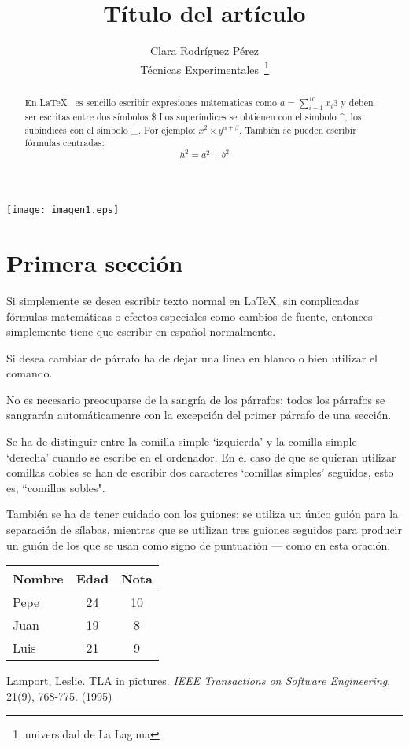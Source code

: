 \documentclass[a4paper,12pt]{article}
\begin{document}
\texttt{[image: imagen1.eps]}

\title{Título del artículo}
\author{Clara Rodr\'iguez P\'erez \\
          Técnicas Experimentales~\footnote{universidad de La Laguna}
          }
\date{\Today}
\maketitle
\begin{abstract}
  En \LaTeX{}~\cite{Lam:86} es sencillo escribir expresiones
  mátematicas como $a=\sum_{i=1}^{10} {x_i}{3}$
  y deben ser escritas entre dos símbolos \$
  Los superíndices se obtienen con el símbolo \^{},
  los subíndices con el símbolo \_.
  Por ejemplo: $x^2\times y ^{\alpha + \beta}$.
  También se pueden escribir f\'ormulas centradas:
  \[h^2=a^2  + b^2\]
\end{abstract}

\section{Primera sección}

Si simplemente se desea escribir texto normal en LaTeX, 
sin complicadas f\'ormulas matem\'aticas o efectos especiales
como cambios de fuente, entonces simplemente tiene que escribir
en espa\~nol normalmente.\par
Si desea cambiar de párrafo ha de dejar una línea en blanco o bien
utilizar el comando. \par
No es necesario preocuparse de la sangría de los párrafos:
todos los párrafos se sangrarán automáticamenre con la excepción
del primer párrafo de una sección.

Se ha de distinguir entre la comilla simple `izquierda'
y la comilla simple `derecha' cuando se escribe en el ordenador.
En el caso de que se quieran utilizar comillas dobles se han de
escribir dos caracteres `comillas simples' seguidos, esto es,
``comillas sobles".

También se ha de tener cuidado con los guiones: se utiliza un único
guión para la separación de sílabas, mientras que se utilizan 
tres guiones seguidos para producir un guión de los que se usan 
como signo de puntuación --- como en esta oración.

\bigskip
\begin{tabular}{|l|c|c|}
\hline
   Nombre & Edad & Nota \\ \hline
   Pepe   & 24   &  10  \\ \hline
   Juan   & 19   &   8   \\ \hline
   Luis   & 21   &   9   \\ \hline
\end{tabular}

\begin{thebibliography}{00}
    Lamport, Leslie.
    TLA in pictures.
    \emph{IEEE Transactions on Software Engineering},
    21(9), 768-775.
    (1995)
\end{thebibliography}
\end{document}
